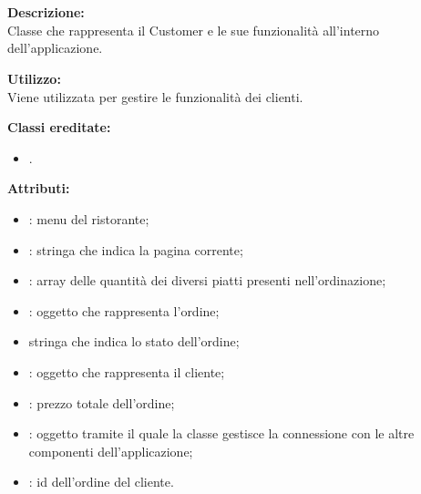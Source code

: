 \paragraph[::BubbleCustomer]{\class}\mbox{}\\ \label{\class}
\textbf{Descrizione:}\\
Classe che rappresenta il Customer e le sue funzionalità all'interno dell'applicazione.

\textbf{Utilizzo:}\\
Viene utilizzata per gestire le funzionalità dei clienti.

\textbf{Classi ereditate:}
\begin{itemize}
	\item {}.
\end{itemize}


\textbf{Attributi:}
\begin{itemize}
	\item {}: menu del ristorante;
	\item {}: stringa che indica la pagina corrente;
	\item {}: array delle quantità dei diversi piatti presenti nell'ordinazione;
	\item {}: oggetto che rappresenta l'ordine;
	\item {} stringa che indica lo stato dell'ordine;
	\item {}: oggetto che rappresenta il cliente;
	\item {}: prezzo totale dell'ordine;
	\item {}: oggetto tramite il quale la classe gestisce la connessione con le altre componenti dell'applicazione;
	\item {}: id dell'ordine del cliente.
\end{itemize}

